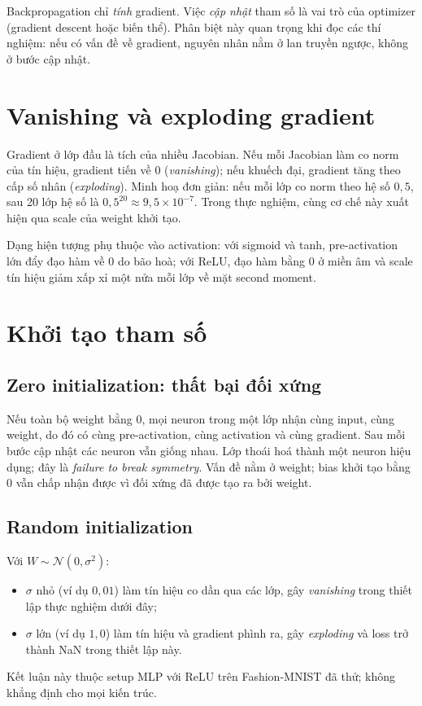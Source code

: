 \documentclass[12pt,a4paper]{article}
\begin{document}
Backpropagation chỉ \emph{tính} gradient. Việc \emph{cập nhật} tham số là vai trò của optimizer (gradient descent hoặc biến thể). Phân biệt này quan trọng khi đọc các thí nghiệm: nếu có vấn đề về gradient, nguyên nhân nằm ở lan truyền ngược, không ở bước cập nhật.

\section{Vanishing và exploding gradient}
Gradient ở lớp đầu là tích của nhiều Jacobian. Nếu mỗi Jacobian làm co norm của tín hiệu, gradient tiến về 0 (\emph{vanishing}); nếu khuếch đại, gradient tăng theo cấp số nhân (\emph{exploding}). Minh hoạ đơn giản: nếu mỗi lớp co norm theo hệ số $0{,}5$, sau 20 lớp hệ số là $0{,}5^{20}\approx 9{,}5\times 10^{-7}$. Trong thực nghiệm, cùng cơ chế này xuất hiện qua scale của weight khởi tạo.

Dạng hiện tượng phụ thuộc vào activation: với sigmoid và tanh, pre-activation lớn đẩy đạo hàm về 0 do bão hoà; với ReLU, đạo hàm bằng 0 ở miền âm và scale tín hiệu giảm xấp xỉ một nửa mỗi lớp về mặt second moment.

\section{Khởi tạo tham số}
\subsection{Zero initialization: thất bại đối xứng}
Nếu toàn bộ weight bằng 0, mọi neuron trong một lớp nhận cùng input, cùng weight, do đó có cùng pre-activation, cùng activation và cùng gradient. Sau mỗi bước cập nhật các neuron vẫn giống nhau. Lớp thoái hoá thành một neuron hiệu dụng; đây là \emph{failure to break symmetry}. Vấn đề nằm ở weight; bias khởi tạo bằng 0 vẫn chấp nhận được vì đối xứng đã được tạo ra bởi weight.

\subsection{Random initialization}
Với $W\sim\mathcal N(0,\sigma^2)$:
\begin{itemize}
  \item $\sigma$ nhỏ (ví dụ $0{,}01$) làm tín hiệu co dần qua các lớp, gây \emph{vanishing} trong thiết lập thực nghiệm dưới đây;
  \item $\sigma$ lớn (ví dụ $1{,}0$) làm tín hiệu và gradient phình ra, gây \emph{exploding} và loss trở thành NaN trong thiết lập này.
\end{itemize}
Kết luận này thuộc setup MLP với ReLU trên Fashion-MNIST đã thử; không khẳng định cho mọi kiến trúc.
\end{document}
